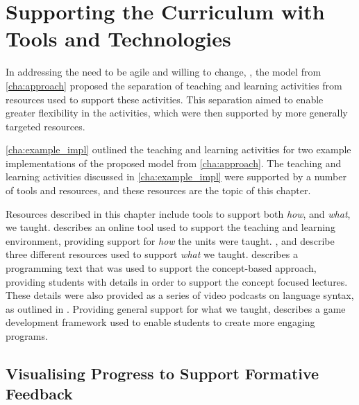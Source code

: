 
\chapter{Supporting the Curriculum with Tools and Technologies} %
\label{cha:supporting}

\graphicspath{{Figures/Supporting/}}

In addressing the need to be agile and willing to change, , the model from \cref{cha:approach} proposed the separation of teaching and learning activities from resources used to support these activities. This separation aimed to enable greater flexibility in the activities, which were then supported by more generally targeted resources.

\cref{cha:example_impl} outlined the teaching and learning activities for two example implementations of the proposed model from \cref{cha:approach}. The teaching and learning activities discussed in \cref{cha:example_impl} were supported by a number of tools and resources, and these resources are the topic of this chapter.

Resources described in this chapter include tools to support both \emph{how}, and \emph{what}, we taught.  describes an online tool used to support the teaching and learning environment, providing support for \emph{how} the units were taught. ,  and  describe three different resources used to support \emph{what} we taught.  describes a programming text that was used to support the concept-based approach, providing students with details in order to support the concept focused lectures. These details were also provided as a series of video podcasts on language syntax, as outlined in . Providing general support for what we taught,  describes a game development framework used to enable students to create more engaging programs.


\section{Visualising Progress to Support Formative Feedback} %
\label{sec:doubtfire}


